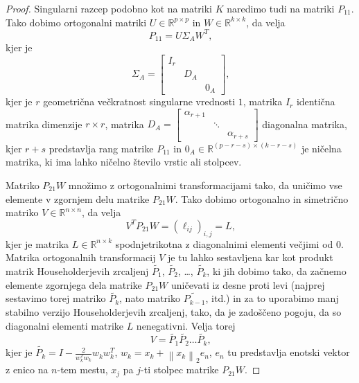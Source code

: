 \documentclass[mat1]{article}
\newcommand{\norm}[1]{\left\lVert#1\right\rVert}
\theoremstyle{definition}
\begin{document}
\begin{proof}
Singularni razcep podobno kot na matriki $K$ naredimo tudi na matriki $P_{11}$. Tako dobimo ortogonalni matriki $U \in \mathbb{R}^{p \times p}$ in $W \in \mathbb{R}^{k \times k}$, da velja $$ P_{11} = U \Sigma_A W^T \text{,}$$ kjer je $$\Sigma_A = 
\begin{bmatrix} 
I_r &  & \\
 & D_A & \\
 & & 0_A  
\end{bmatrix} \text{,}$$ kjer je $r$ geometrična večkratnost singularne vrednosti $1$, matrika $I_r$ identična matrika dimenzije $r \times r$, matrika $D_A =
\begin{bmatrix}
\alpha_{r+1} & & \\
 & \ddots & \\
 & & \alpha_{r+s}
\end{bmatrix}$ diagonalna matrika, kjer $r+s$ predstavlja rang matrike $P_{11}$ in $0_A \in \mathbb{R}^{(p-r-s) \times (k-r-s)}$ je ničelna matrika, ki ima lahko ničelno število vrstic ali stolpcev.


Matriko $P_{21} W$ množimo z ortogonalnimi transformacijami tako, da uničimo vse elemente v zgornjem delu matrike $P_{21} W$. Tako dobimo ortogonalno in simetrično matriko $V \in \mathbb{R}^{n \times n}$, da velja 
$$ V^T P_{21} W = (\ell_{ij})_{i, j} = L 
\text{,}$$
kjer je matrika $L \in \mathbb{R}^{n \times k}$ spodnjetrikotna z diagonalnimi elementi večjimi od $0$. Matrika ortogonalnih transformacij $V$ je tu lahko sestavljena kar kot produkt matrik Householderjevih zrcaljenj $\tilde{P_1}$, $\tilde{P_2}$, \ldots, $\tilde{P_k}$, ki jih dobimo tako, da začnemo elemente zgornjega dela matrike $P_{21} W$ uničevati iz desne proti levi (najprej sestavimo torej matriko $\tilde{P_k}$, nato matriko $\tilde{P_{k-1}}$, itd.) in za to uporabimo manj stabilno verzijo Householderjevih zrcaljenj, tako, da je zadoščeno pogoju, da so diagonalni elementi matrike $L$ nenegativni.
Velja torej $$V = \tilde{P_1} \tilde{P_2} \dots \tilde{P_k} \text{,}$$
kjer je $\tilde{P_k} = I - \frac{2}{w_k^T w_k} w_k w_k^T$, $w_k = x_k + \norm{x_k}_2 e_n$, $e_n$ tu predstavlja enotski vektor z enico na $n$-tem mestu, $x_j$ pa $j$-ti stolpec matrike $P_{21} W$.



\end{proof}
\end{document}
